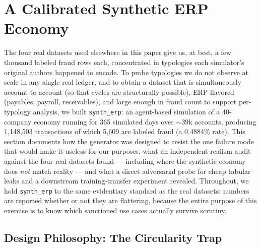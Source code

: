 \section{A Calibrated Synthetic ERP Economy}\label{sec:synthetic}

The four real datasets used elsewhere in this paper give us, at best, a few
thousand labeled fraud rows each, concentrated in typologies each simulator's
original authors happened to encode. To probe typologies we do not observe at
scale in any single real ledger, and to obtain a dataset that is simultaneously
account-to-account (so that cycles are structurally possible), ERP-flavored
(payables, payroll, receivables), and large enough in fraud count to support
per-typology analysis, we built \texttt{synth\_erp}: an agent-based simulation
of a 40-company economy running for 365 simulated days over $\sim$39k accounts,
producing 1{,}148{,}503 transactions of which 5{,}609 are labeled fraud
(a 0.4884\% rate). This section documents how the generator was designed to
resist the one failure mode that would make it useless for our purposes, what
an independent realism audit against the four real datasets found — including
where the synthetic economy does \emph{not} match reality — and what a direct
adversarial probe for cheap tabular leaks and a downstream training-transfer
experiment revealed. Throughout, we hold \texttt{synth\_erp} to the same
evidentiary standard as the real datasets: numbers are reported whether or not
they are flattering, because the entire purpose of this exercise is to know
which sanctioned use cases actually survive scrutiny.

\subsection{Design Philosophy: The Circularity Trap}
\label{sec:synthetic-trap}

